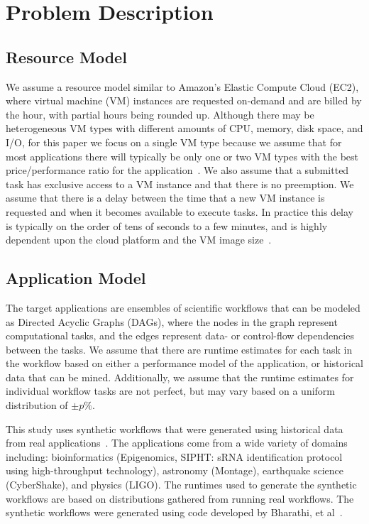 \documentclass[conference]{IEEEtran}
\begin{document}
 
\section{Problem Description}
\label{sec:problem}

\subsection{Resource Model}

We assume a resource model similar to Amazon's Elastic Compute Cloud (EC2),
where virtual machine (VM) instances are requested on-demand and are billed by
the hour, with partial hours being rounded up. Although there may be
heterogeneous VM types with different amounts of CPU, memory, disk space, and
I/O, for this paper we focus on a single VM type because we assume that for most
applications there will typically be only one or two VM types with the best
price/performance ratio for the application~\cite{Juve2009}. We also assume that
a submitted task has exclusive access to a VM instance and that there is no
preemption. We assume that there is a delay between the time that a new VM
instance is requested and when it becomes available to execute tasks. In
practice this delay is typically on the order of tens of seconds to a few
minutes, and is highly dependent upon the cloud platform and the VM image
size~\cite{Nurmi2008b}.



\subsection{Application Model}

The target applications are ensembles of scientific workflows that can be
modeled as Directed Acyclic Graphs (DAGs), where the nodes in the graph
represent computational tasks, and the edges represent data- or control-flow
dependencies between the tasks. We assume that there are runtime estimates for
each task in the workflow based on either a performance model of the
application, or historical data that can be mined. Additionally, we assume that
the runtime estimates for individual workflow tasks are not perfect, but may
vary based on a uniform distribution of $\pm p\%$.


This study uses synthetic workflows that were generated using historical data
from real applications~\cite{Bharathi2008}. The applications come from a wide
variety of domains including: bioinformatics (Epigenomics, SIPHT: sRNA
identification protocol using high-throughput technology), astronomy (Montage),
earthquake science (CyberShake), and physics (LIGO). The runtimes used to
generate the synthetic workflows are based on distributions gathered from
running real workflows. The synthetic workflows were generated using code
developed by Bharathi, et al~\cite{WorkflowGenerator}.
\end{document}
